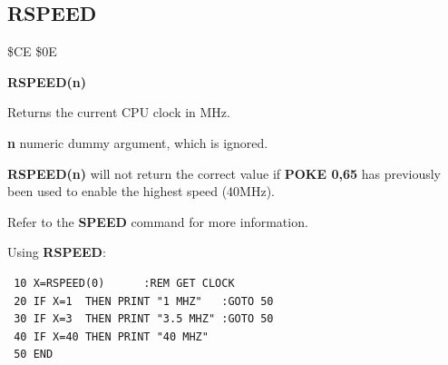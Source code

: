 \subsection{RSPEED}
\begin{description}[leftmargin=2cm,style=nextline]
\item [Token:] \$CE \$0E
\item [Format:] {\bf RSPEED(n)}
\item [Usage:]  Returns the current CPU clock in MHz.

                {\bf n} numeric dummy argument, which is ignored.

\item [Remarks:] {\bf RSPEED(n)} will not return the correct value if {\bf POKE 0,65}
                 has previously been used to enable the highest speed (40MHz).

                 Refer to the {\bf SPEED} command for more information.

\item [Example:] Using {\bf RSPEED}:
\begin{tcolorbox}[colback=black,coltext=white]
\verbatimfont{\codefont}
\begin{verbatim}
 10 X=RSPEED(0)      :REM GET CLOCK
 20 IF X=1  THEN PRINT "1 MHZ"   :GOTO 50
 30 IF X=3  THEN PRINT "3.5 MHZ" :GOTO 50
 40 IF X=40 THEN PRINT "40 MHZ"
 50 END
\end{verbatim}
\end{tcolorbox}
\end{description}


\newpage
